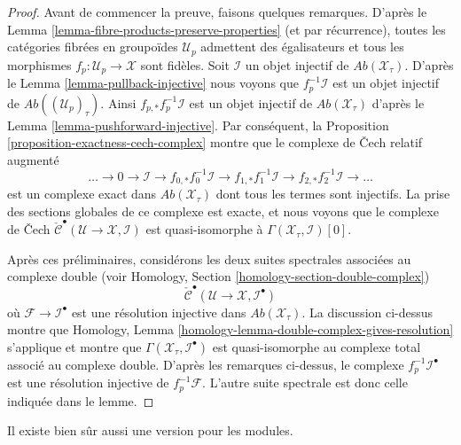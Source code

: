 \begin{proof}
Avant de commencer la preuve, faisons quelques remarques. D'après le
Lemma \ref{lemma-fibre-products-preserve-properties}
(et par récurrence), toutes les catégories fibrées en groupoïdes $\mathcal{U}_p$
admettent des égalisateurs et tous les morphismes $f_p : \mathcal{U}_p \to \mathcal{X}$
sont fidèles. Soit $\mathcal{I}$ un objet injectif
de $\textit{Ab}(\mathcal{X}_\tau)$. D'après le
Lemma \ref{lemma-pullback-injective}
nous voyons que $f_p^{-1}\mathcal{I}$ est un objet injectif de
$\textit{Ab}((\mathcal{U}_p)_\tau)$.
Ainsi $f_{p, *}f_p^{-1}\mathcal{I}$ est un objet injectif de
$\textit{Ab}(\mathcal{X}_\tau)$ d'après le
Lemma \ref{lemma-pushforward-injective}.
Par conséquent, la
Proposition \ref{proposition-exactness-cech-complex}
montre que le complexe de {\v C}ech relatif augmenté
$$
\ldots \to 0 \to
\mathcal{I} \to
f_{0, *}f_0^{-1}\mathcal{I} \to
f_{1, *}f_1^{-1}\mathcal{I} \to
f_{2, *}f_2^{-1}\mathcal{I} \to \ldots
$$
est un complexe exact dans $\textit{Ab}(\mathcal{X}_\tau)$ dont tous les
termes sont injectifs. La prise des sections globales de ce complexe est exacte,
et nous voyons que le complexe de {\v C}ech
$\check{\mathcal{C}}^\bullet(\mathcal{U} \to \mathcal{X}, \mathcal{I})$
est quasi-isomorphe à $\Gamma(\mathcal{X}_\tau, \mathcal{I})[0]$.

\medskip\noindent
Après ces préliminaires, considérons les deux suites spectrales
associées au complexe double (voir
Homology, Section \ref{homology-section-double-complex})
$$
\check{\mathcal{C}}^\bullet(\mathcal{U} \to \mathcal{X}, \mathcal{I}^\bullet)
$$
où $\mathcal{F} \to \mathcal{I}^\bullet$ est une résolution injective
dans $\textit{Ab}(\mathcal{X}_\tau)$.
La discussion ci-dessus montre que
Homology, Lemma \ref{homology-lemma-double-complex-gives-resolution}
s'applique et montre que
$\Gamma(\mathcal{X}_\tau, \mathcal{I}^\bullet)$
est quasi-isomorphe au complexe total associé au complexe double.
D'après les remarques ci-dessus, le complexe $f_p^{-1}\mathcal{I}^\bullet$ est une
résolution injective de $f_p^{-1}\mathcal{F}$. L'autre suite
spectrale est donc celle indiquée dans le lemme.
\end{proof}

\noindent
Il existe bien sûr aussi une version pour les modules.

